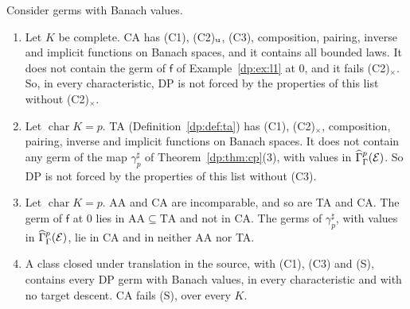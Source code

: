 \begin{theorem}\label{dp:thm:descents-independent}
Consider germs with Banach values.
\begin{enumerate}
\item Let $K$ be complete. CA has \textup{(C1)}, \textup{(C2)}$_{\rm u}$, \textup{(C3)}, composition, pairing, inverse and implicit functions on Banach spaces, and it contains all bounded laws. It does not contain the germ of $\mathsf f$ of Example~\ref{dp:ex:l1} at $0$, and it fails \textup{(C2)}$_\times$. So, in every characteristic, DP is not forced by the properties of this list without \textup{(C2)}$_\times$.
\item Let $\operatorname{char}K=p$. TA (Definition~\ref{dp:def:ta}) has \textup{(C1)}, \textup{(C2)}$_\times$, composition, pairing, inverse and implicit functions on Banach spaces. It does not contain any germ of the map $\gamma^\sharp_p$ of Theorem~\ref{dp:thm:cp}(3), with values in $\widehat\Gamma^p_\Gamma(\mathcal E)$. So DP is not forced by the properties of this list without \textup{(C3)}.
\item Let $\operatorname{char}K=p$. AA and CA are incomparable, and so are TA and CA. The germ of $\mathsf f$ at $0$ lies in $\mathrm{AA}\subseteq\mathrm{TA}$ and not in CA. The germs of $\gamma^\sharp_p$, with values in $\widehat\Gamma^p_\Gamma(\mathcal E)$, lie in CA and in neither AA nor TA.
\item A class closed under translation in the source, with \textup{(C1)}, \textup{(C3)} and \textup{(S)}, contains every DP germ with Banach values, in every characteristic and with no target descent. CA fails \textup{(S)}, over every $K$.
\end{enumerate}
\end{theorem}

